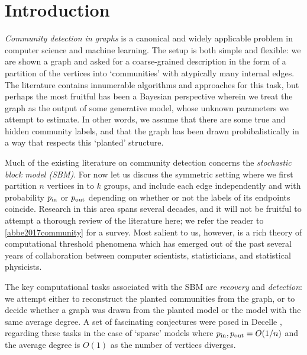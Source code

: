 \section{Introduction}
\label{sec:intro}



\emph{Community detection in graphs} is a canonical and widely applicable problem in computer science and machine learning. The setup is both simple and flexible: we are shown a graph and asked for a coarse-grained description in the form of a partition of the vertices into `communities' with atypically many internal edges. The literature contains innumerable algorithms and approaches for this task, but perhaps the most fruitful has been a Bayesian perspective wherein we treat the graph as the output of some generative model, whose unknown parameters we attempt to estimate. In other words, we assume that there are some true and hidden community labels, and that the graph has been drawn probibalistically in a way that respects this `planted' structure.

Much of the existing literature on community detection concerns the \emph{stochastic block model (SBM)}. For now let us discuss the symmetric setting where we first partition $n$ vertices in to $k$ groups, and include each edge independently and with probability $p_{\textup{in}}$ or $p_{\textup{out}}$ depending on whether or not the labels of its endpoints coincide. Research in this area spans several decades, and it will not be fruitful to attempt a thorough review of the literature here; we refer the reader to \ref{abbe2017community} for a survey. Most salient to us, however, is a rich theory of computational threshold phenomena which has emerged out of the past several years of collaboration between computer scientists, statisticians, and statistical physicists.

The key computational tasks associated with the SBM are \emph{recovery} and \emph{detection}: we attempt either to reconstruct the planted communities from the graph, or to decide whether a graph was drawn from the planted model or the \ER model with the same average degree. A set of fascinating conjectures were posed in Decelle \etal \cite{decelle2011inference}, regarding these tasks in the case of `sparse' models where $p_{\textup{in}},p_{\textup{out}} = O(1/n)$ and the average degree is $O(1)$ as the number of vertices diverges. 

